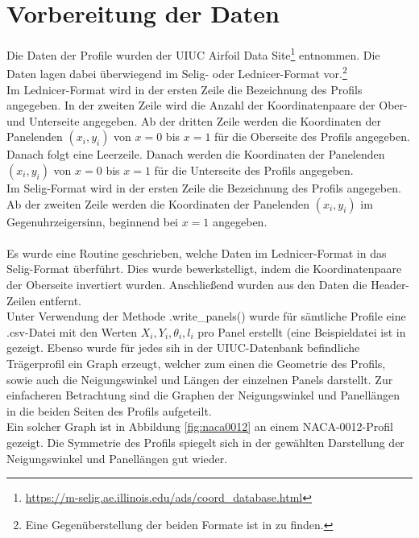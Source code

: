 \section{Vorbereitung der Daten}
Die Daten der Profile wurden der UIUC Airfoil Data Site\footnote{\url{https://m-selig.ae.illinois.edu/ads/coord_database.html}} entnommen. Die Daten lagen dabei überwiegend im Selig- oder Lednicer-Format vor.\footnote{Eine Gegenüberstellung der beiden Formate ist in  zu finden.}
\\
Im Lednicer-Format wird in der ersten Zeile die Bezeichnung des Profils angegeben. In der zweiten Zeile wird die Anzahl der Koordinatenpaare der Ober- und Unterseite angegeben. Ab der dritten Zeile werden die Koordinaten der Panelenden $(x_i,y_i)$ von $x=0$ bis $x=1$ für die Oberseite des Profils angegeben. Danach folgt eine Leerzeile. Danach werden die Koordinaten der Panelenden $(x_i,y_i)$ von $x=0$ bis $x=1$ für die Unterseite des Profils angegeben.
\\
Im Selig-Format wird in der ersten Zeile die Bezeichnung des Profils angegeben. Ab der zweiten Zeile werden die Koordinaten der Panelenden $(x_i,y_i)$ im Gegenuhrzeigersinn, beginnend bei $x=1$ angegeben.
\\\\
Es wurde eine Routine geschrieben, welche Daten im Lednicer-Format in das Selig-Format überführt. Dies wurde bewerkstelligt, indem die Koordinatenpaare der Oberseite invertiert wurden. Anschließend wurden aus den Daten die Header-Zeilen entfernt. \\
Unter Verwendung der Methode .write\_panels() wurde für sämtliche Profile eine .csv-Datei mit den Werten $X_i, Y_i, \theta _i, l_i$ pro Panel erstellt (eine Beispieldatei ist in  gezeigt. Ebenso wurde für jedes sih in der UIUC-Datenbank befindliche Trägerprofil ein Graph erzeugt, welcher zum einen die Geometrie des Profils, sowie auch die Neigungswinkel und Längen der einzelnen Panels darstellt. Zur einfacheren Betrachtung sind die Graphen der Neigungswinkel und Panellängen in die beiden Seiten des Profils aufgeteilt. 
\\Ein solcher Graph ist in Abbildung \ref{fig:naca0012} an einem NACA-0012-Profil gezeigt. Die Symmetrie des Profils spiegelt sich in der gewählten Darstellung der Neigungswinkel und Panellängen gut wieder.

